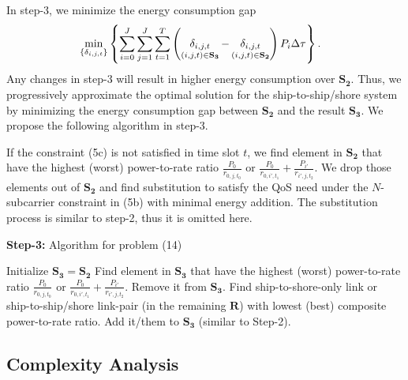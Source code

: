 \documentclass[conference]{IEEEtran}
\begin{document}
 In step-3, we minimize the energy consumption gap 
 \begin{align}
   &\mathop {\min }\limits_{\left\{ {{\delta _{i,j,t}}} \right\}} \left\{ {\sum\limits_{i = 0}^J {\sum\limits_{j = 1}^J {\sum\limits_{t = 1}^T {\left( {\mathop {{\delta _{i,j,t}}}\limits_{\left( {i,j,t} \right) \in {{\bf{S}}_{\bf{3}}}}  - \mathop {{\delta _{i,j,t}}}\limits_{\left( {i,j,t} \right) \in {{\bf{S}}_{\bf{2}}}} } \right){P_i}\Delta \tau } } } } \right\}.
 \end{align}
 Any changes in step-3 will result in higher energy consumption over ${{\mathbf{S}}_{\mathbf{2}}}$. Thus, we progressively approximate the optimal solution for the ship-to-ship/shore system by minimizing the energy consumption gap between ${{\mathbf{S}}_{\mathbf{2}}}$ and the result ${{\mathbf{S}}_{\mathbf{3}}}$. 
 We propose the following algorithm in step-3.
 
 If the constraint (5c) is not satisfied in time slot ${t}$, we find element in ${{\mathbf{S}}_{\mathbf{2}}}$ that have the highest (worst) power-to-rate ratio ${\frac{P_0}{r_{0,j,{t_0}}}}$ or  $ {\frac{{{P_0}}}{{{r_{0,i',{t_1}}}}} + \frac{{{P_{i'}}}}{{{r_{i',j,{t_2}}}}}} $. We drop those elements out of ${{\mathbf{S}}_{\mathbf{2}}}$ and find substitution to satisfy the QoS need under the $N$-subcarrier constraint in (5b) with minimal energy addition. The substitution process is similar to step-2, thus it is omitted here. 
 
 \begin{algorithm}[ht]
 \caption{\textbf{Step-3:} Algorithm for problem (14)}
 \begin{algorithmic}[1]
 \STATE Initialize ${{\mathbf{S}}_{\mathbf{3}}}={{\mathbf{S}}_{\mathbf{2}}}$
   \STATE Find element in ${{\mathbf{S}}_{\mathbf{3}}}$ that have the highest (worst) power-to-rate ratio ${\frac{P_0}{r_{0,j,{t_0}}}}$ or $ {\frac{{{P_0}}}{{{r_{0,i',{t_1}}}}} + \frac{{{P_{i'}}}}{{{r_{i',j,{t_2}}}}}} $. 
   \STATE Remove it from ${{\mathbf{S}}_{\mathbf{3}}}$.
    \STATE Find ship-to-shore-only link or ship-to-ship/shore link-pair (in the remaining ${\mathbf{R}}$) with lowest (best) composite power-to-rate ratio. 
    \STATE Add it/them to ${{\mathbf{S}}_{\mathbf{3}}}$ (similar to Step-2). 
   \ENDWHILE
  \ENDIF
 \ENDFOR
 \end{algorithmic}
 \end{algorithm}

 \subsection{Complexity Analysis}
\end{document}

